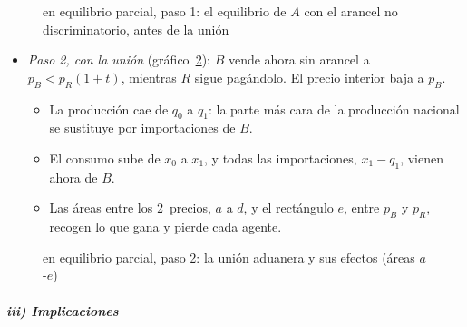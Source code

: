 \documentclass[11pt]{article}
\begin{document}
\begin{figure}[H]
\centering
\caption{ en equilibrio parcial, paso 1: el equilibrio de $A$ con el arancel no discriminatorio, antes de la unión}\label{fig:viner-lipsey-paso1}
\end{figure}

\begin{itemize}
\item \emph{Paso 2, con la unión} (gráfico~\ref{fig:viner-lipsey-paso2}): $B$ vende ahora sin arancel a $p_B<p_R(1+t)$, mientras $R$ sigue pagándolo. El precio interior baja a $p_B$.
  \begin{itemize}
  \item La producción cae de $q_0$ a $q_1$: la parte más cara de la producción nacional se sustituye por importaciones de $B$.
  \item El consumo sube de $x_0$ a $x_1$, y todas las importaciones, $x_1-q_1$, vienen ahora de $B$.
  \item Las áreas entre los 2~precios, $a$ a $d$, y el rectángulo $e$, entre $p_B$ y $p_R$, recogen lo que gana y pierde cada agente.
  \end{itemize}
\end{itemize}

\begin{figure}[H]
\centering
\caption{ en equilibrio parcial, paso 2: la unión aduanera y sus efectos (áreas $a$-$e$)}\label{fig:viner-lipsey-paso2}
\end{figure}

\subparagraph{iii) Implicaciones}
\end{document}

